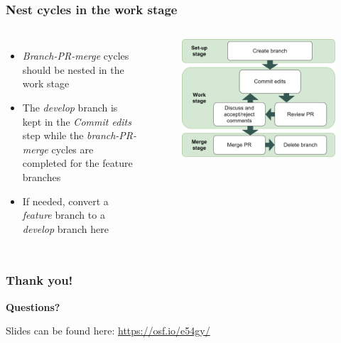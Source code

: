 \documentclass[aspectratio=169]{beamer} %
\begin{document}
\begin{frame}
	\frametitle{Nest cycles in the work stage}
	\begin{columns}[c]

		\begin{itemize}
			\setlength\itemsep{1em}
			\item \textit{Branch-PR-merge} cycles should be nested
			in the work stage
			\item The \textit{develop} branch is kept
			in the \textit{Commit edits} step while
			the \textit{branch-PR-merge} cycles are completed
			for the feature branches
			\item If needed, convert a \textit{feature} branch
			to a \textit{develop} branch here
		\end{itemize}

		\vspace{-.75cm}
		\begin{figure}
			\centering
			\includegraphics[width=\textwidth]{./img/branch-pr-merge-cycle.png}
		\end{figure}
	\end{columns}
\end{frame}

\begin{frame}
	\frametitle{Thank you!}
	\huge\centering \textbf{Questions?}

	\vspace{1cm}
	\normalsize Slides can be found here: \url{https://osf.io/e54gy/}
\end{frame}
\end{document}
